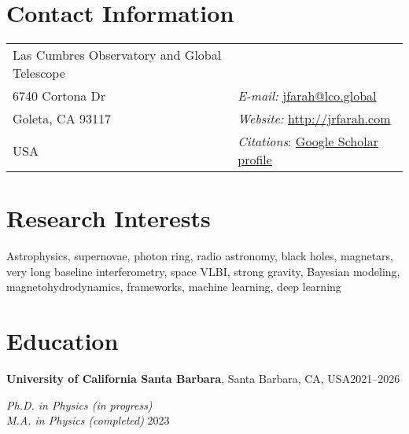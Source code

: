 \documentclass[margin,line]{res}
\begin{document}
\begin{resume}

\section{\sc Contact Information}
\vspace{.05in}
\begin{tabular}{@{}p{3in}p{4in}}
Las Cumbres Observatory and Global Telescope \\             
6740 Cortona Dr  & {\it E-mail:} \href{mailto:jfarah@lco.global}{\color{blue}jfarah@lco.global}\\
Goleta, CA 93117  & {\it Website:} \href{http://jrfarah.com}{\color{blue}http://jrfarah.com} \\
USA & \textit{Citations}: \href{https://scholar.google.com/citations?hl=en&user=EVnW70sAAAAJ}{\color{blue}Google Scholar profile}\\
\end{tabular}


\section{\sc Research Interests}

Astrophysics, supernovae, photon ring, radio astronomy, black holes, magnetars, very long baseline interferometry, space VLBI, strong gravity, Bayesian modeling, magnetohydrodynamics, frameworks, machine learning, deep learning


\vspace*{-1mm}
\section{\sc Education}
\label{sec:education}

{\bf University of California Santa Barbara}, Santa Barbara, CA, USA\hfill 2021--2026

\vspace{-.35cm}
{\em Ph.D. in Physics (in progress)}\\
{\em M.A. in Physics (completed) } \hfill 2023


\end{resume}
\end{document}
